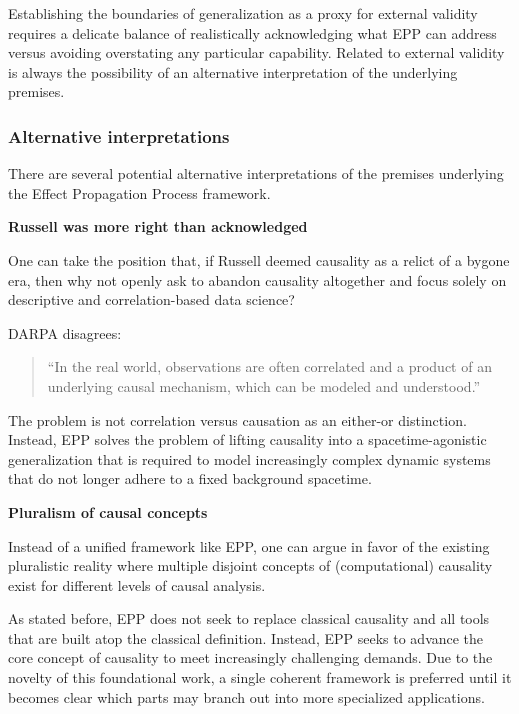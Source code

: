 \documentclass{article}
\begin{document}
Establishing the boundaries of generalization as a proxy for external validity requires a delicate balance of realistically acknowledging what EPP can address versus avoiding overstating  any particular capability. Related to external validity is always the possibility of an alternative interpretation of the underlying premises.

\subsubsection{Alternative interpretations}

There are several potential alternative interpretations of the premises underlying the Effect Propagation Process framework.

\textbf{Russell was more right than acknowledged}

One can take the position that, if Russell deemed causality as a relict of a bygone era, then why not openly ask to abandon causality altogether and focus solely on descriptive and correlation-based data science?

DARPA disagrees\cite{DARPA_ANSR}:

\begin{quote}
    “In the real world, observations are often correlated and a product of an underlying causal mechanism, which can be modeled and understood.”
\end{quote}

The problem is not correlation versus causation as an either-or distinction. Instead, EPP solves the problem of lifting causality into a spacetime-agonistic generalization that is required to model increasingly complex dynamic systems that do not longer adhere to a fixed background spacetime.

\textbf{Pluralism of causal concepts}

Instead of a unified framework like EPP, one can argue in favor of the existing pluralistic reality where multiple disjoint concepts of (computational) causality exist for different levels of causal analysis.

As stated before, EPP does not seek to replace classical causality and all tools that are built atop the classical definition. Instead, EPP seeks to advance the core concept of causality to meet increasingly challenging demands. Due to the novelty of this foundational work, a single coherent framework is preferred until it becomes clear which parts may branch out into more specialized applications.
\end{document}

